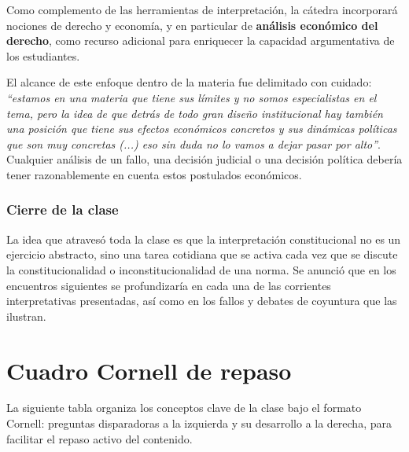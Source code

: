 \documentclass[12pt,oneside]{book}
\begin{document}
Como complemento de las herramientas de interpretación, la cátedra incorporará nociones de derecho y economía, y en particular de \textbf{análisis económico del derecho}, como recurso adicional para enriquecer la capacidad argumentativa de los estudiantes.

El alcance de este enfoque dentro de la materia fue delimitado con cuidado: \textit{``estamos en una materia que tiene sus límites y no somos especialistas en el tema, pero la idea de que detrás de todo gran diseño institucional hay también una posición que tiene sus efectos económicos concretos y sus dinámicas políticas que son muy concretas (...) eso sin duda no lo vamos a dejar pasar por alto''}. Cualquier análisis de un fallo, una decisión judicial o una decisión política debería tener razonablemente en cuenta estos postulados económicos.

\subsection{Cierre de la clase}

La idea que atravesó toda la clase es que la interpretación constitucional no es un ejercicio abstracto, sino una tarea cotidiana que se activa cada vez que se discute la constitucionalidad o inconstitucionalidad de una norma. Se anunció que en los encuentros siguientes se profundizaría en cada una de las corrientes interpretativas presentadas, así como en los fallos y debates de coyuntura que las ilustran.

\chapter[Cuadro Cornell de repaso]{Cuadro Cornell de repaso}

La siguiente tabla organiza los conceptos clave de la clase bajo el formato Cornell: preguntas disparadoras a la izquierda y su desarrollo a la derecha, para facilitar el repaso activo del contenido.
\end{document}
